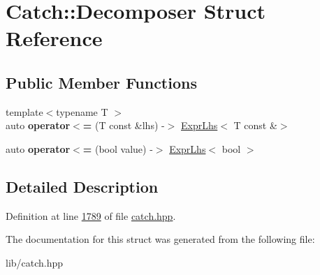 \hypertarget{structCatch_1_1Decomposer}{}\section{Catch\+::Decomposer Struct Reference}
\label{structCatch_1_1Decomposer}
\subsection*{Public Member Functions}
\begin{DoxyCompactItemize}
\item 
\mbox{\label{structCatch_1_1Decomposer_a20b5b8c0e2ff0328a019ae1a8deca03a}} 
{\footnotesize template$<$typename T $>$ }\\auto {\bfseries operator$<$=} (T const \&lhs) -\/$>$ \mbox{\hyperlink{classCatch_1_1ExprLhs}{Expr\+Lhs}}$<$ T const \&$>$
\item 
\mbox{\label{structCatch_1_1Decomposer_aac129b94903ae1339d5709049d83613b}} 
auto {\bfseries operator$<$=} (bool value) -\/$>$ \mbox{\hyperlink{classCatch_1_1ExprLhs}{Expr\+Lhs}}$<$ bool $>$
\end{DoxyCompactItemize}


\subsection{Detailed Description}


Definition at line \mbox{\hyperlink{catch_8hpp_source_l01789}{1789}} of file \mbox{\hyperlink{catch_8hpp_source}{catch.\+hpp}}.



The documentation for this struct was generated from the following file\+:\begin{DoxyCompactItemize}
\item 
lib/catch.\+hpp\end{DoxyCompactItemize}
